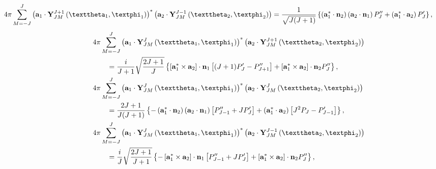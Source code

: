 \begin{enumerate}[label=(\alph*)]
\begin{fleqn}
\begin{subequations}
\begin{align}
4 \pi \sum_{M=-J}^{J}\left(\vect{a}_{1} \cdot \vect{Y}_{J M}^{J+1}\left(\vartheta_{1}, \varphi_{1}\right)\right)^{*}\left(\vect{a}_{2} \cdot \vect{Y}_{J M}^{J-1}\left(\vartheta_{2}, \varphi_{2}\right)\right)&=\frac{1}{\sqrt{J(J+1)}}\left\{\left(\vect{a}_{1}^{*} \cdot \vect{n}_{2}\right)\left(\vect{a}_{2} \cdot \vect{n}_{1}\right) P_{J}^{\prime \prime}+\left(\vect{a}_{1}^{*} \cdot \vect{a}_{2}\right) P_{J}^{\prime}\right\}, 
\end{align}
\end{subequations}
\begin{subequations}
\begin{align}
\MoveEqLeft{4 \pi \sum_{M=-J}^{J}\left(\vect{a}_{1} \cdot \vect{Y}_{J M}^{J}\left(\vartheta_{1}, \varphi_{1}\right)\right)^{*}\left(\vect{a}_{2} \cdot \vect{Y}_{J M}^{J+1}\left(\vartheta_{2}, \varphi_{2}\right)\right)}  \notag\\
\qquad\qquad&=\frac{i}{J+1} \sqrt{\frac{2 J+1}{J}}\left\{\left[\vect{a}_{1}^{*} \times \vect{a}_{2}\right] \cdot \vect{n}_{1}\left[(J+1) P_{J}^{\prime}-P_{J+1}^{\prime \prime}\right]+\left[\vect{a}_{1}^{*} \times \vect{a}_{2}\right] \cdot \vect{n}_{2} P_{J}^{\prime \prime}\right\}, \\
\MoveEqLeft{4 \pi \sum_{M=-J}^{J}\left(\vect{a}_{1} \cdot \vect{Y}_{J M}^{J}\left(\vartheta_{1}, \varphi_{1}\right)\right)^{*}\left(\vect{a}_{2} \cdot \vect{Y}_{J M}^{J}\left(\vartheta_{2}, \varphi_{2}\right)\right) } \notag\\
&=\frac{2 J+1}{J(J+1)}\left\{-\left(\vect{a}_{1}^{*} \cdot \vect{n}_{2}\right)\left(\vect{a}_{2} \cdot \vect{n}_{1}\right)\left[P_{J-1}^{\prime \prime}+J P_{J}^{\prime}\right]+\left(\vect{a}_{1}^{*} \cdot \vect{a}_{2}\right)\left[J^{2} P_{J}-P_{J-1}^{\prime}\right]\right\}  \label{eq:7:3:110},\\
\MoveEqLeft{4\pi \sum_{M=-J}^{J}\left(\vect{a}_{1} \cdot \vect{Y}_{J M}^{J}\left(\vartheta_{1}, \varphi_{1}\right)\right)^{*}\left(\vect{a}_{2} \cdot \vect{Y}_{J M}^{J-1}\left(\vartheta_{2}, \varphi_{2}\right)\right)}  \notag\\
&=\frac{i}{J} \sqrt{\frac{2 J+1}{J+1}}\left\{-\left[\vect{a}_{1}^{*} \times \vect{a}_{2}\right] \cdot \vect{n}_{1}\left[P_{J-1}^{\prime \prime}+J P_{J}^{\prime}\right]+\left[\vect{a}_{1}^{*} \times \vect{a}_{2}\right] \cdot \vect{n}_{2} P_{J}^{\prime \prime}\right\}, 
\end{align}
\end{subequations}
\begin{subequations}
    \begin{align}

\end{align}
\end{subequations}
\end{fleqn}
\end{enumerate}
